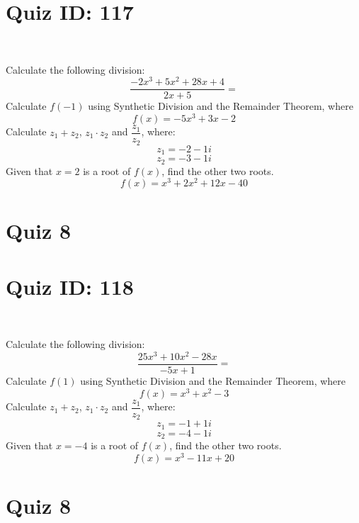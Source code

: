 \documentclass{exam}
\begin{document}
\section*{Quiz ID: 117}
\vspace{0.5cm}\
\vspace{1cm}\
\begin{questions}
\question Calculate the following division:\[\dfrac{
-2x^3 + 5x^2 + 28x + 4}{
2x + 5}=\] \makeemptybox{\stretch{2}}
\question Calculate $f(-1)$ using Synthetic Division and the Remainder Theorem, where\[f(x) = 
-5x^3 + 3x - 2\]
\newpage\question Calculate $z_1+z_2$, $z_1\cdot z_2$ and $\dfrac{z_1}{z_2}$, where:\[z_1=-2-1\mathit{i}\]\[z_2=-3-1\mathit{i}\]
\question Given that $x=2$ is a root of $f(x)$, find the other two roots.\[f(x)=
x^3 + 2x^2 + 12x - 40\]\makeemptybox{\stretch{1}}
\end{questions}\newpage
\newpage
\section*{Quiz 8}
\section*{Quiz ID: 118}
\vspace{0.5cm}\
\vspace{1cm}\
\begin{questions}
\question Calculate the following division:\[\dfrac{
25x^3 + 10x^2 - 28x}{
-5x + 1}=\] 
\question Calculate $f(1)$ using Synthetic Division and the Remainder Theorem, where\[f(x) = 
x^3 + x^2 - 3\]
\newpage\question Calculate $z_1+z_2$, $z_1\cdot z_2$ and $\dfrac{z_1}{z_2}$, where:\[z_1=-1+1\mathit{i}\]\[z_2=-4-1\mathit{i}\]\makeemptybox{\stretch{1}}
\question Given that $x=-4$ is a root of $f(x)$, find the other two roots.\[f(x)=
x^3 - 11x + 20\]\makeemptybox{\stretch{1}}
\end{questions}\newpage
\newpage
\section*{Quiz 8}
\end{document}
